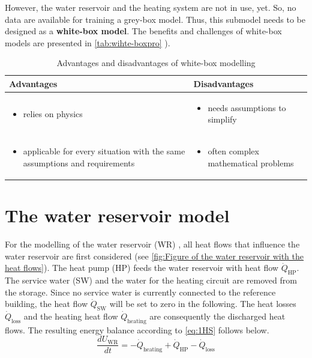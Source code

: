     \newline
    However, the water reservoir and the heating system are not in use, yet. So, no data are available for training a grey-box model. Thus, this submodel needs to be designed as a \textbf{white-box model}.
    \newline
    The benefits and challenges of white-box models are presented in \autoref{tab:wihte-boxpro} \cite{EstradaFlores.2006}).
    \begin{table}[h!]
        \centering
        \begin{tabular}{p{7.3cm} | p{7.3cm}}
        \hline
          Advantages  &  Disadvantages\\
        \hline
        \begin{itemize}
            \item relies on physics
        \end{itemize}
      & \begin{itemize}
            \item needs assumptions to simplify 
        \end{itemize}\\
     \begin{itemize}
            \item applicable for every situation with the same assumptions and requirements 
        \end{itemize} & \begin{itemize}
            \item often complex mathematical problems
        \end{itemize}\\
        \end{tabular}
        \caption {Advantages and disadvantages of white-box modelling}
        \label{tab:wihte-boxpro}
    \end{table}

    \section{The water reservoir model}
    \label{waterModel}
    For the modelling of the water reservoir (WR) , all heat flows that influence the water reservoir are first considered (see \autoref{fig:Figure of the water reservoir with the heat flows}). The heat pump (HP)  feeds the water reservoir with heat flow $\dot{Q}_\text{HP}$. The service water (SW)  and the water for the heating circuit are removed from the storage. Since no service water is currently connected to the reference building, the heat flow $\dot{Q}_\text{SW}$ will be set to zero in the following. The heat losses $\dot{Q}_\text{loss}$ and the heating heat flow  $\dot{Q}_\text{heating}$ are consequently the discharged heat flows. The resulting energy balance according to \autoref{eq:1HS} follows below.
    \begin{equation}
        \label{waterReservoir}
        \frac{d U_\text{WR}}{d t}= -\dot{Q}_\text{heating} + \dot{Q}_\text{HP} - \dot{Q}_\text{loss}
    \end{equation}
    
